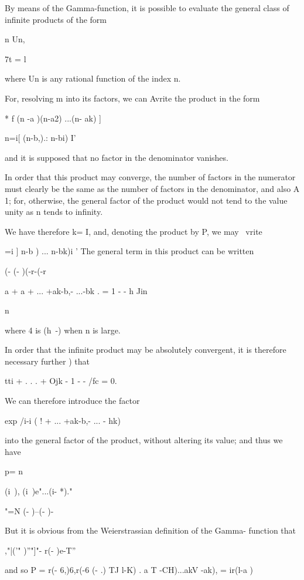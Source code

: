 
By means of the Gamma-function, it is possible to evaluate the general
class of infinite products of the form

n Un,

7t = l

where Un is any rational function of the index n.

For, resolving m into its factors, we can Avrite the product in the
form

* f (n -a )(n-a2) ...(n- ak) ]

n=i[ (n-b,).: n-bi) I'

and it is supposed that no factor in the denominator vanishes.

In order that this product may converge, the number of factors in the
numerator must clearly be the same as the number of factors in the
denominator, and also A 1; for, otherwise, the general factor of the
product would not tend to the value unity as n tends to infinity.

We have therefore k= I, and, denoting the product by P, we may \ vrite

 =i ] n-b ) ... n-bk)i ' The general term in this product can be
written

(- (- )(-r-(-r

a + a + ... +ak-b,- ...-bk . = 1 - - h Jin

n

where 4 is (h~-) when n is large.

In order that the infinite product may be absolutely convergent, it is
therefore necessary further ) that

tti + . . . + Ojk - 1 -   - /fc = 0.

%
%

We can therefore introduce the factor

exp /i-i ( ! + ... +ak-b,- ... - hk)

into the general factor of the product, without altering its value;
and thus we have

p= n

(i\ ), (i\ )e"...(i- *)."

"=N (- )--(- )-

But it is obvious from the Weierstrassian definition of the Gamma-
function that

,"|('" )''"]"- r(- )e-T''

and so P = r(- 6,)6,r(-6 (- .) TJ l-K) . a T -CH)...akV -ak), =
ir(l-a )


